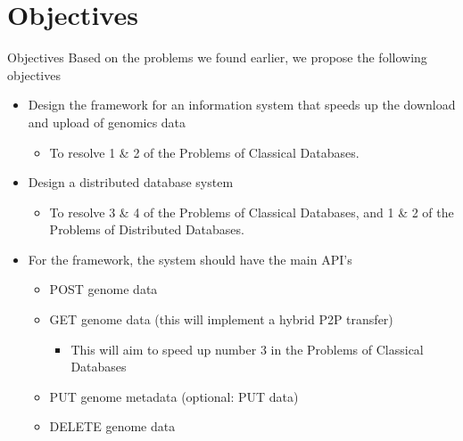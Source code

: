 \documentclass{beamer}
\begin{document}

\section{Objectives}

\begin{frame}{Objectives}
Based on the problems we found earlier, we propose the following objectives
\begin{itemize}
    \item Design the framework for an information system that speeds up the download and upload of genomics data
    \begin{itemize} 
        \item To resolve 1 \& 2 of the Problems of Classical Databases. 
    \end{itemize}
    \item  Design a distributed database system
    \begin{itemize}
        \item To resolve 3 \& 4 of the Problems of Classical Databases, and 1 \& 2 of the Problems of Distributed Databases. 
    \end{itemize}
\end{itemize}


\begin{itemize}
    \item For the framework, the system should have the main API’s 
    \begin{itemize}
        \item POST genome data
        \item GET genome data (this will implement a hybrid P2P transfer)
        \begin{itemize}
            \item This will aim to speed up number 3 in the Problems of Classical Databases
        \end{itemize}
        \item PUT genome metadata (optional: PUT data)
        \item DELETE genome data
    \end{itemize}
\end{itemize}
\end{frame}
\end{document}
